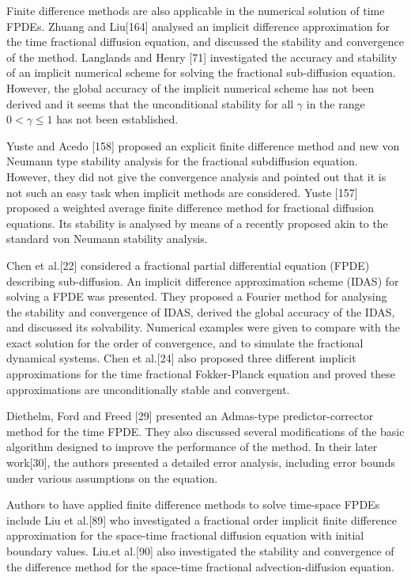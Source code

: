 {Finite difference methods are also applicable in the numerical solution of time FPDEs. Zhuang and Liu[164] analysed an implicit difference approximation for the time fractional diffusion equation, and discussed the stability and convergence of the method. Langlands and Henry [71] investigated the accuracy and stability of an implicit numerical scheme for solving the fractional sub-diffusion equation. However, the global accuracy of the implicit numerical scheme has not been derived and it seems that the unconditional stability for all $\gamma$ in the range $0<\gamma \leq 1$ has not been established.\

Yuste and Acedo [158] proposed an explicit finite difference method and new von Neumann type stability analysis for the fractional subdiffusion equation. However, they did not give the convergence analysis and pointed out that it is not such an easy task when implicit methods are considered. Yuste [157] proposed a weighted average finite difference method for fractional diffusion equations. Its stability is analysed by means of a recently proposed akin to the standard von Neumann stability analysis.\

Chen et al.[22] considered a fractional partial differential equation (FPDE) describing sub-diffusion. An implicit difference approximation scheme (IDAS) for solving a FPDE was presented. They proposed a Fourier method for analysing the stability and convergence of IDAS, derived the global accuracy of the IDAS, and discussed its solvability. Numerical examples were given to compare with the exact solution for the order of convergence, and to simulate the fractional dynamical systems. Chen et al.[24] also proposed three different implicit approximations for the time fractional Fokker-Planck equation and proved these approximations are unconditionally stable and convergent.\

Diethelm, Ford and Freed [29] presented an Admas-type predictor-corrector method for the time FPDE. They also discussed several modifications of the basic algorithm designed to improve the performance of the method. In their later work[30], the authors presented a detailed error analysis, including error bounds under various assumptions on the equation.\

Authors to have applied finite difference methods to solve time-space FPDEs include Liu et al.[89] who investigated a fractional order implicit finite difference approximation for the space-time fractional diffusion equation with initial boundary values. Liu.et al.[90] also investigated the stability and convergence of the difference method for the space-time fractional advection-diffusion equation.\

}
